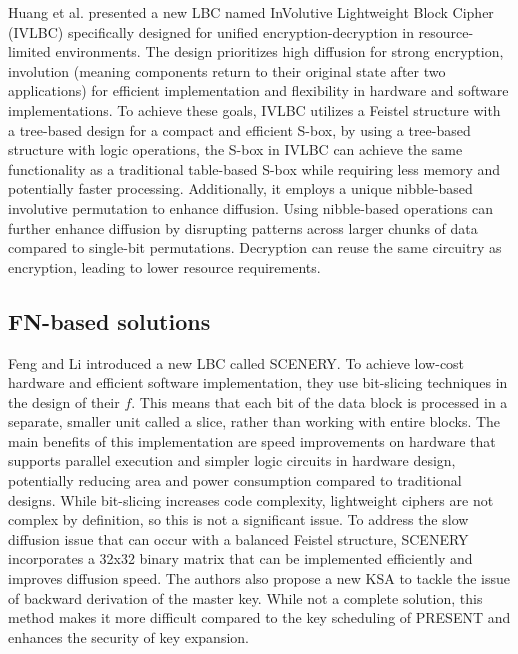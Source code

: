 \documentclass[conference]{IEEEtran}
\begin{document}
Huang et al. presented a new LBC named InVolutive Lightweight Block Cipher (IVLBC) specifically designed for unified encryption-decryption in resource-limited environments. The design prioritizes high diffusion for strong encryption, involution (meaning components return to their original state after two applications) for efficient implementation and flexibility in hardware and software implementations. To achieve these goals, IVLBC utilizes a Feistel structure with a tree-based design for a compact and efficient S-box, by using a tree-based structure with logic operations, the S-box in IVLBC can achieve the same functionality as a traditional table-based S-box while requiring less memory and potentially faster processing. Additionally, it employs a unique nibble-based involutive permutation to enhance diffusion. Using nibble-based operations can further enhance diffusion by disrupting patterns across larger chunks of data compared to single-bit permutations. Decryption can reuse the same circuitry as encryption, leading to lower resource requirements\cite{IVLBC}.

\subsection{FN-based solutions}

Feng and Li introduced a new LBC called SCENERY. To achieve low-cost hardware and efficient software implementation, they use bit-slicing techniques in the design of their $f$. This means that each bit of the data block is processed in a separate, smaller unit called a slice, rather than working with entire blocks. The main benefits of this implementation are speed improvements on hardware that supports parallel execution and simpler logic circuits in hardware design, potentially reducing area and power consumption compared to traditional designs. While bit-slicing increases code complexity, lightweight ciphers are not complex by definition, so this is not a significant issue. To address the slow diffusion issue that can occur with a balanced Feistel structure, SCENERY incorporates a 32x32 binary matrix that can be implemented efficiently and improves diffusion speed. The authors also propose a new KSA to tackle the issue of backward derivation of the master key. While not a complete solution, this method makes it more difficult compared to the key scheduling of PRESENT\cite{PRESENT} and enhances the security of key expansion.\cite{SCENERY}
\end{document}

